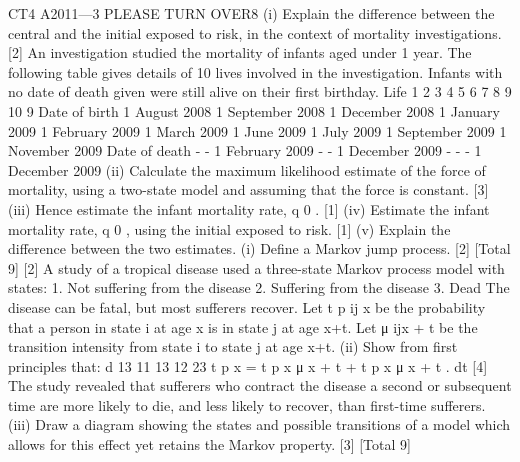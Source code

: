 \documentclass[a4paper,12pt]{article}
\begin{document}
\begin{enumerate}
[Total 8]
CT4 A2011—3
PLEASE TURN OVER8
(i)
Explain the difference between the central and the initial exposed to
risk, in the context of mortality investigations.
[2]
An investigation studied the mortality of infants aged under 1 year. The following
table gives details of 10 lives involved in the investigation. Infants with no date of
death given were still alive on their first birthday.
Life
1
2
3
4
5
6
7
8
9
10
9
Date of birth
1 August 2008
1 September 2008
1 December 2008
1 January 2009
1 February 2009
1 March 2009
1 June 2009
1 July 2009
1 September 2009
1 November 2009
Date of death
-
-
1 February 2009
-
-
1 December 2009
-
-
-
1 December 2009
(ii) Calculate the maximum likelihood estimate of the force of mortality, using a
two-state model and assuming that the force is constant.
[3]
(iii) Hence estimate the infant mortality rate, q 0 .
[1]
(iv) Estimate the infant mortality rate, q 0 , using the initial exposed to risk.
[1]
(v) Explain the difference between the two estimates.
(i) Define a Markov jump process.
[2]
[Total 9]
[2]
A study of a tropical disease used a three-state Markov process model with states:
1. Not suffering from the disease
2. Suffering from the disease
3. Dead
The disease can be fatal, but most sufferers recover. Let t p ij x be the probability that a
person in state i at age x is in state j at age x+t. Let μ ijx + t be the transition intensity
from state i to state j at age x+t.
(ii)
Show from first principles that:
d 13
11 13
12 23
t p x = t p x μ x + t + t p x μ x + t .
dt
[4]
The study revealed that sufferers who contract the disease a second or subsequent
time are more likely to die, and less likely to recover, than first-time sufferers.
(iii)
Draw a diagram showing the states and possible transitions of a model which
allows for this effect yet retains the Markov property.
[3]
[Total 9]


\end{enumerate}
\end{document}
